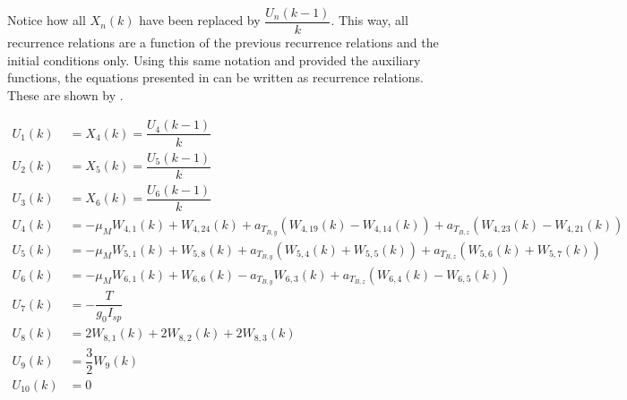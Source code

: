 Notice how all $X_{n}\left(k\right)$ have been replaced by $\dfrac{U_{n}\left(k-1\right)}{k}$. This way, all recurrence relations are a function of the previous recurrence relations and the initial conditions only. Using this same notation and provided the auxiliary functions, the equations presented in  can be written as recurrence relations. These are shown by .

\begin{equation} \label{eq:allRecRel1}
\begin{split}
U_{1}\left(k\right)&=X_{4}\left(k\right)=\dfrac{U_{4}\left(k-1\right)}{k}\\
U_{2}\left(k\right)&=X_{5}\left(k\right)=\dfrac{U_{5}\left(k-1\right)}{k}\\
U_{3}\left(k\right)&=X_{6}\left(k\right)=\dfrac{U_{6}\left(k-1\right)}{k} \\
U_{4}\left(k\right)&=-\mu_{M}W_{4,1}\left(k\right)+W_{4,24}\left(k\right)+a_{T_{B,y}}\left(W_{4,19}\left(k\right)-W_{4,14}\left(k\right)\right)+a_{T_{B,z}}\left(W_{4,23}\left(k\right)-W_{4,21}\left(k\right)\right)\\
U_{5}\left(k\right)&=-\mu_{M}W_{5,1}\left(k\right)+W_{5,8}\left(k\right)+a_{T_{B,y}}\left(W_{5,4}\left(k\right)+W_{5,5}\left(k\right)\right)+a_{T_{B,z}}\left(W_{5,6}\left(k\right)+W_{5,7}\left(k\right)\right)\\
U_{6}\left(k\right)&=-\mu_{M}W_{6,1}\left(k\right)+W_{6,6}\left(k\right)-a_{T_{B,y}}W_{6,3}\left(k\right)+a_{T_{B,z}}\left(W_{6,4}\left(k\right)-W_{6,5}\left(k\right)\right)\\
U_{7} \left(k\right)&=-\dfrac{T}{g_{0}I_{sp}}\\
U_{8}\left(k\right)&=2W_{8,1}\left(k\right)+2W_{8,2}\left(k\right)+2W_{8,3}\left(k\right)\\
U_{9}\left(k\right)&=\dfrac{3}{2}W_{9}\left(k\right)\\
U_{10} \left(k\right)&= 0 \\
\end{split}
\end{equation}




